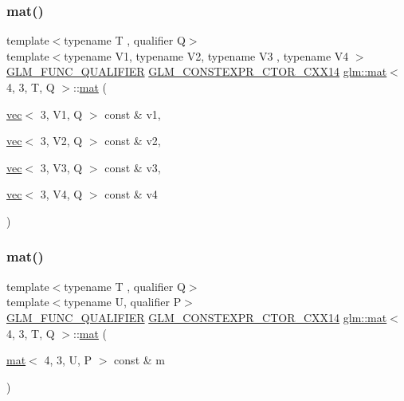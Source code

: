 \subsubsection{\texorpdfstring{mat()}{mat()}\hspace{0.1cm}{\footnotesize\ttfamily [20/21]}}
{\footnotesize\ttfamily template$<$typename T , qualifier Q$>$ \\
template$<$typename V1, typename V2, typename V3 , typename V4 $>$ \\
\mbox{\hyperlink{setup_8hpp_a33fdea6f91c5f834105f7415e2a64407}{G\+L\+M\+\_\+\+F\+U\+N\+C\+\_\+\+Q\+U\+A\+L\+I\+F\+I\+ER}} \mbox{\hyperlink{setup_8hpp_a0900f9145e68bf6061b6f5e7be3fa751}{G\+L\+M\+\_\+\+C\+O\+N\+S\+T\+E\+X\+P\+R\+\_\+\+C\+T\+O\+R\+\_\+\+C\+X\+X14}} \mbox{\hyperlink{structglm_1_1mat}{glm\+::mat}}$<$ 4, 3, T, Q $>$\+::\mbox{\hyperlink{structglm_1_1mat}{mat}} (\begin{DoxyParamCaption}\item[{\mbox{\hyperlink{structglm_1_1vec}{vec}}$<$ 3, V1, Q $>$ const \&}]{v1,  }\item[{\mbox{\hyperlink{structglm_1_1vec}{vec}}$<$ 3, V2, Q $>$ const \&}]{v2,  }\item[{\mbox{\hyperlink{structglm_1_1vec}{vec}}$<$ 3, V3, Q $>$ const \&}]{v3,  }\item[{\mbox{\hyperlink{structglm_1_1vec}{vec}}$<$ 3, V4, Q $>$ const \&}]{v4 }\end{DoxyParamCaption})}

\mbox{\label{structglm_1_1mat_3_014_00_013_00_01_t_00_01_q_01_4_a8227f64e941f2a66f0ac66efde15e224}} 
\subsubsection{\texorpdfstring{mat()}{mat()}\hspace{0.1cm}{\footnotesize\ttfamily [21/21]}}
{\footnotesize\ttfamily template$<$typename T , qualifier Q$>$ \\
template$<$typename U, qualifier P$>$ \\
\mbox{\hyperlink{setup_8hpp_a33fdea6f91c5f834105f7415e2a64407}{G\+L\+M\+\_\+\+F\+U\+N\+C\+\_\+\+Q\+U\+A\+L\+I\+F\+I\+ER}} \mbox{\hyperlink{setup_8hpp_a0900f9145e68bf6061b6f5e7be3fa751}{G\+L\+M\+\_\+\+C\+O\+N\+S\+T\+E\+X\+P\+R\+\_\+\+C\+T\+O\+R\+\_\+\+C\+X\+X14}} \mbox{\hyperlink{structglm_1_1mat}{glm\+::mat}}$<$ 4, 3, T, Q $>$\+::\mbox{\hyperlink{structglm_1_1mat}{mat}} (\begin{DoxyParamCaption}\item[{\mbox{\hyperlink{structglm_1_1mat}{mat}}$<$ 4, 3, U, P $>$ const \&}]{m }\end{DoxyParamCaption})}



